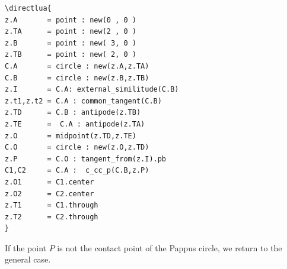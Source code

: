 \vspace{6pt}
\begin{minipage}{0.5\textwidth}
\begin{Verbatim}
\directlua{
z.A       = point : new(0 , 0 )
z.TA      = point : new(2 , 0 )
z.B       = point : new( 3, 0 )
z.TB      = point : new( 2, 0 )
C.A       = circle : new(z.A,z.TA)
C.B       = circle : new(z.B,z.TB)
z.I       = C.A: external_similitude(C.B)
z.t1,z.t2 = C.A : common_tangent(C.B)
z.TD      = C.B : antipode(z.TB)
z.TE      =  C.A : antipode(z.TA)
z.O       = midpoint(z.TD,z.TE)
C.O       = circle : new(z.O,z.TD)
z.P       = C.O : tangent_from(z.I).pb
C1,C2     = C.A :  c_cc_p(C.B,z.P)
z.O1      = C1.center
z.O2      = C2.center
z.T1      = C1.through
z.T2      = C2.through
}   
\end{Verbatim}
\end{minipage}
\begin{minipage}{0.5\textwidth}
\end{minipage}

\vspace{6pt}
If the point $P$ is not the contact point of the Pappus circle, we return to the general case.

